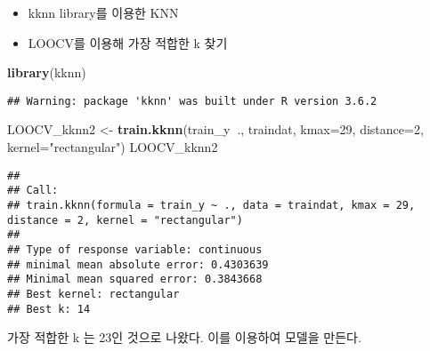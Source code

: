 \documentclass[]{article}
\newenvironment{Shaded}{\begin{snugshade}}{\end{snugshade}}
\newcommand{\DataTypeTok}[1]{\textcolor[rgb]{0.13,0.29,0.53}{#1}}
\newcommand{\DecValTok}[1]{\textcolor[rgb]{0.00,0.00,0.81}{#1}}
\newcommand{\KeywordTok}[1]{\textcolor[rgb]{0.13,0.29,0.53}{\textbf{#1}}}
\newcommand{\NormalTok}[1]{#1}
\newcommand{\OperatorTok}[1]{\textcolor[rgb]{0.81,0.36,0.00}{\textbf{#1}}}
\newcommand{\StringTok}[1]{\textcolor[rgb]{0.31,0.60,0.02}{#1}}
\begin{document}
\begin{itemize}
\item
  kknn library를 이용한 KNN
\item
  LOOCV를 이용해 가장 적합한 k 찾기
\end{itemize}

\begin{Shaded}
\begin{Highlighting}[]
\KeywordTok{library}\NormalTok{(kknn)}
\end{Highlighting}
\end{Shaded}

\begin{verbatim}
## Warning: package 'kknn' was built under R version 3.6.2
\end{verbatim}

\begin{Shaded}
\begin{Highlighting}[]
\NormalTok{LOOCV_kknn2 <-}\StringTok{ }\KeywordTok{train.kknn}\NormalTok{(train_y}\OperatorTok{~}\NormalTok{., traindat, }\DataTypeTok{kmax=}\DecValTok{29}\NormalTok{, }\DataTypeTok{distance=}\DecValTok{2}\NormalTok{, }\DataTypeTok{kernel=}\StringTok{"rectangular"}\NormalTok{)}
\NormalTok{LOOCV_kknn2}
\end{Highlighting}
\end{Shaded}

\begin{verbatim}
## 
## Call:
## train.kknn(formula = train_y ~ ., data = traindat, kmax = 29,     distance = 2, kernel = "rectangular")
## 
## Type of response variable: continuous
## minimal mean absolute error: 0.4303639
## Minimal mean squared error: 0.3843668
## Best kernel: rectangular
## Best k: 14
\end{verbatim}

가장 적합한 k 는 23인 것으로 나왔다. 이를 이용하여 모델을 만든다.

\begin{Shaded}
\end{Shaded}
\end{document}
